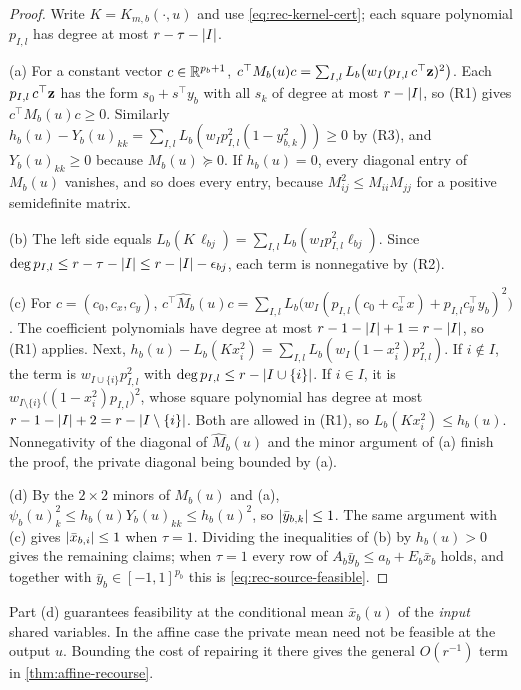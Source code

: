 \begin{proof}
Write $K=K_{m,b}(\cdot,u)$ and use \eqref{eq:rec-kernel-cert}; each square
polynomial $p_{I,l}$ has degree at most $r-\tau-\lvert I\rvert$.

(a) For a constant vector $c\in\mathbb{R}^{p_b+1}$,
$c^\top M_b(u)c=\sum_{I,l}L_b\bigl(w_I(p_{I,l}\,c^\top\mathbf{z})^2\bigr)$. Each
$p_{I,l}\,c^\top\mathbf{z}$ has the form $s_0+s^\top y_b$ with all $s_k$ of degree
at most $r-\lvert I\rvert$, so (R1) gives $c^\top M_b(u)c\ge0$. Similarly
$h_b(u)-Y_b(u)_{kk}=\sum_{I,l}L_b(w_Ip_{I,l}^2(1-y_{b,k}^2))\ge0$ by (R3),
and $Y_b(u)_{kk}\ge0$ because $M_b(u)\succeq0$. If $h_b(u)=0$, every
diagonal entry of $M_b(u)$ vanishes, and so does every entry, because
$M_{ij}^2\le M_{ii}M_{jj}$ for a positive semidefinite matrix.

(b) The left side equals $L_b(K\,\ell_{bj})=\sum_{I,l}L_b(w_Ip_{I,l}^2
\ell_{bj})$. Since $\deg p_{I,l}\le r-\tau-\lvert I\rvert\le r-\lvert I\rvert-\epsilon_{bj}$,
each term is nonnegative by (R2).

(c) For $c=(c_0,c_x,c_y)$, $c^\top\widehat M_b(u)c=\sum_{I,l}L_b\bigl(w_I
(p_{I,l}(c_0+c_x^\top x)+p_{I,l}c_y^\top y_b)^2\bigr)$. The coefficient
polynomials have degree at most $r-1-\lvert I\rvert+1=r-\lvert I\rvert$, so (R1) applies.
Next, $h_b(u)-L_b(Kx_i^2)=\sum_{I,l}L_b(w_I(1-x_i^2)p_{I,l}^2)$. If
$i\notin I$, the term is $w_{I\cup\{i\}}p_{I,l}^2$ with
$\deg p_{I,l}\le r-\lvert I\cup\{i\}\rvert$. If $i\in I$, it is
$w_{I\setminus\{i\}}\bigl((1-x_i^2)p_{I,l}\bigr)^2$, whose square polynomial
has degree at most $r-1-\lvert I\rvert+2=r-\lvert I\setminus\{i\}\rvert$. Both are
allowed in (R1), so $L_b(Kx_i^2)\le h_b(u)$. Nonnegativity of the diagonal
of $\widehat M_b(u)$ and the minor argument of (a) finish the proof, the
private diagonal being bounded by (a).

(d) By the $2\times2$ minors of $M_b(u)$ and (a),
$\psi_b(u)_k^2\le h_b(u)Y_b(u)_{kk}\le h_b(u)^2$, so $\lvert \bar y_{b,k}\rvert\le1$.
The same argument with (c) gives $\lvert \bar x_{b,i}\rvert\le1$ when $\tau=1$.
Dividing the inequalities of (b) by $h_b(u)>0$ gives the remaining
claims; when $\tau=1$ every row of $A_b\bar y_b\le a_b+E_b\bar x_b$ holds,
and together with $\bar y_b\in[-1,1]^{p_b}$ this is
\eqref{eq:rec-source-feasible}.
\end{proof}

Part (d) guarantees feasibility at the conditional mean $\bar x_b(u)$ of the
\emph{input} shared variables. In the affine case the private mean need not
be feasible at the output $u$. Bounding the cost of repairing it there gives
the general $O(r^{-1})$ term in \cref{thm:affine-recourse}.

